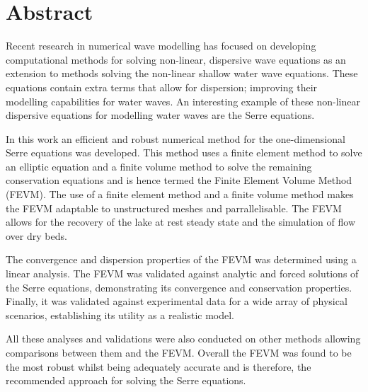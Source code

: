 \chapter*{Abstract}\label{abstract}


Recent research in numerical wave modelling has focused on developing computational methods for solving non-linear, dispersive wave equations as an extension to methods solving the non-linear shallow water wave equations. These equations contain extra terms that allow for dispersion; improving their modelling capabilities for water waves. An interesting example of these non-linear dispersive equations for modelling water waves are the Serre equations. 

In this work an efficient and robust numerical method for the one-dimensional Serre equations was developed. This method uses a finite element method to solve an elliptic equation and a finite volume method to solve the remaining conservation equations and is hence termed the Finite Element Volume Method (FEVM). The use of a finite element method and a finite volume method makes the FEVM adaptable to unstructured meshes and parrallelisable. The FEVM allows for the recovery of the lake at rest steady state and the simulation of flow over dry beds.

The convergence and dispersion properties of the FEVM was determined using a linear analysis. The FEVM was validated against analytic and forced solutions of the Serre equations, demonstrating its convergence and conservation properties. Finally, it was validated against experimental data for a wide array of physical scenarios, establishing its utility as a realistic model.

All these analyses and validations were also conducted on other methods allowing comparisons between them and the FEVM. Overall the FEVM was found to be the most robust whilst being adequately accurate and is therefore, the recommended approach for solving the Serre equations.



